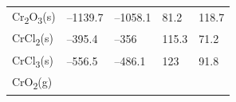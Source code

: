 \documentclass[
  9pt,
]{extbook}
\theoremstyle{definition}
\theoremstyle{definition}
\theoremstyle{definition}
\theoremstyle{remark}
\begin{document}
\begin{longtable}[]{@{}lllll@{}}
\begin{minipage}[t]{0.10\columnwidth}
Cr\textsubscript{2}O\textsubscript{3}(s)\strut
\end{minipage} & \begin{minipage}[t]{0.19\columnwidth}\raggedright
--1139.7\strut
\end{minipage} & \begin{minipage}[t]{0.20\columnwidth}\raggedright
--1058.1\strut
\end{minipage} & \begin{minipage}[t]{0.18\columnwidth}\raggedright
81.2\strut
\end{minipage} & \begin{minipage}[t]{0.18\columnwidth}\raggedright
118.7\strut
\end{minipage}\tabularnewline
\begin{minipage}[t]{0.10\columnwidth}\raggedright
CrCl\textsubscript{2}(s)\strut
\end{minipage} & \begin{minipage}[t]{0.19\columnwidth}\raggedright
--395.4\strut
\end{minipage} & \begin{minipage}[t]{0.20\columnwidth}\raggedright
--356\strut
\end{minipage} & \begin{minipage}[t]{0.18\columnwidth}\raggedright
115.3\strut
\end{minipage} & \begin{minipage}[t]{0.18\columnwidth}\raggedright
71.2\strut
\end{minipage}\tabularnewline
\begin{minipage}[t]{0.10\columnwidth}\raggedright
CrCl\textsubscript{3}(s)\strut
\end{minipage} & \begin{minipage}[t]{0.19\columnwidth}\raggedright
--556.5\strut
\end{minipage} & \begin{minipage}[t]{0.20\columnwidth}\raggedright
--486.1\strut
\end{minipage} & \begin{minipage}[t]{0.18\columnwidth}\raggedright
123\strut
\end{minipage} & \begin{minipage}[t]{0.18\columnwidth}\raggedright
91.8\strut
\end{minipage}\tabularnewline
\begin{minipage}[t]{0.10\columnwidth}\raggedright
CrO\textsubscript{2}(g)\strut
\end{minipage} & \begin{minipage}[t]{0.19\columnwidth}\raggedright

\end{minipage}
\end{longtable}
\end{document}
